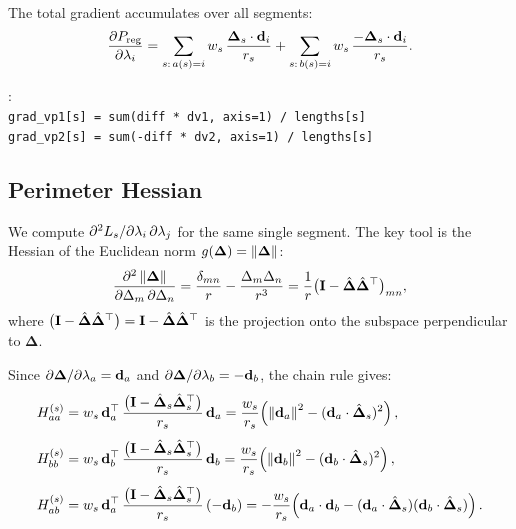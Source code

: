 \documentclass[11pt,a4paper]{article}
\begin{document}
The total gradient accumulates over all segments:
\begin{equation}
  \dfrac{\partial P_{\mathrm{reg}}}{\partial \lambda_i}
    = \sum_{\substack{s:\, a(s)=i}} w_s\,
        \frac{\boldsymbol{\Delta}_s \cdot \mathbf{d}_{i}}{r_s}
    + \sum_{\substack{s:\, b(s)=i}} w_s\,
        \frac{-\boldsymbol{\Delta}_s \cdot \mathbf{d}_{i}}{r_s}.
  \label{eq:grad-P}
\end{equation}

\begin{tcolorbox}[colback=blue!4!white, colframe=blue!40!black,
                  title={Code: perimeter gradient}, fontupper=\small]
: \\[2pt]
\texttt{grad\_vp1[s] = sum(diff * dv1, axis=1) / lengths[s]}\\
\texttt{grad\_vp2[s] = sum(-diff * dv2, axis=1) / lengths[s]}
\end{tcolorbox}

\subsection{Perimeter Hessian}
\label{sec:perimeter-hessian}

We compute $\partial^2 L_s / \partial\lambda_i\,\partial\lambda_j$ for the same
single segment.  The key tool is the Hessian of the Euclidean norm
$g(\boldsymbol{\Delta}) = \left\|\boldsymbol{\Delta}\right\|$:
\begin{equation}
  \frac{\partial^2 \left\|\boldsymbol{\Delta}\right\|}{\partial \Delta_m\,\partial \Delta_n}
  = \frac{\delta_{mn}}{r} - \frac{\Delta_m \Delta_n}{r^3}
  = \frac{1}{r}\bigl(\mathbf{I} - \hat{\boldsymbol{\Delta}} \hat{\boldsymbol{\Delta}}^\top\bigr)_{mn},
  \label{eq:norm-hessian}
\end{equation}
where $\bigl(\mathbf{I} - \hat{\boldsymbol{\Delta}} \hat{\boldsymbol{\Delta}}^\top\bigr) = \mathbf{I} - \hat{\boldsymbol{\Delta}}\hat{\boldsymbol{\Delta}}^\top$ is the projection onto
the subspace perpendicular to $\boldsymbol{\Delta}$.

Since $\partial\boldsymbol{\Delta}/\partial\lambda_a = \mathbf{d}_{a}$ and
$\partial\boldsymbol{\Delta}/\partial\lambda_b = -\mathbf{d}_{b}$, the chain rule gives:
\begin{align}
  H^{(s)}_{aa}
    &= w_s\,\mathbf{d}_{a}^\top \,\frac{\bigl(\mathbf{I} - \hat{\boldsymbol{\Delta}}_s \hat{\boldsymbol{\Delta}}_s^\top\bigr)}{r_s}\, \mathbf{d}_{a}
     = \frac{w_s}{r_s}\!\left(\left\|\mathbf{d}_{a}\right\|^2 - (\mathbf{d}_{a}\cdot\hat{\boldsymbol{\Delta}}_s)^2\right),
  \label{eq:H_aa} \\[4pt]
  H^{(s)}_{bb}
    &= w_s\,\mathbf{d}_{b}^\top \,\frac{\bigl(\mathbf{I} - \hat{\boldsymbol{\Delta}}_s \hat{\boldsymbol{\Delta}}_s^\top\bigr)}{r_s}\, \mathbf{d}_{b}
     = \frac{w_s}{r_s}\!\left(\left\|\mathbf{d}_{b}\right\|^2 - (\mathbf{d}_{b}\cdot\hat{\boldsymbol{\Delta}}_s)^2\right),
  \label{eq:H_bb} \\[4pt]
  H^{(s)}_{ab}
    &= w_s\,\mathbf{d}_{a}^\top \,\frac{\bigl(\mathbf{I} - \hat{\boldsymbol{\Delta}}_s \hat{\boldsymbol{\Delta}}_s^\top\bigr)}{r_s}\, (-\mathbf{d}_{b})
     = -\frac{w_s}{r_s}\!\left(\mathbf{d}_{a}\cdot\mathbf{d}_{b}
         - (\mathbf{d}_{a}\cdot\hat{\boldsymbol{\Delta}}_s)(\mathbf{d}_{b}\cdot\hat{\boldsymbol{\Delta}}_s)\right).
  \label{eq:H_ab}
\end{align}
\end{document}
